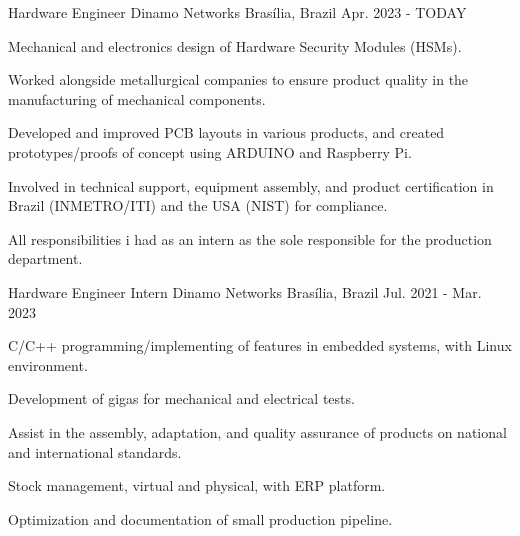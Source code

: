 

\begin{cventries}

  \cventry
    {Hardware Engineer} %
    {Dinamo Networks} %
    {Brasília, Brazil} %
    {Apr. 2023 - TODAY} %
    {
      \begin{cvitems} %
        \item {Mechanical and electronics design of Hardware Security Modules (HSMs).}
        \item {Worked alongside metallurgical companies to ensure product quality in the manufacturing of mechanical components.}
        \item {Developed and improved PCB layouts in various products, and created prototypes/proofs of concept using ARDUINO and Raspberry Pi.}
        \item {Involved in technical support, equipment assembly, and product certification in Brazil (INMETRO/ITI) and the USA (NIST) for compliance.}
        \item {All responsibilities i had as an intern as the sole responsible for the production department.}
      \end{cvitems}
    }

  \cventry
    {Hardware Engineer Intern} %
    {Dinamo Networks} %
    {Brasília, Brazil} %
    {Jul. 2021 - Mar. 2023} %
    {
      \begin{cvitems} %
        \item {C/C++ programming/implementing of features in embedded systems, with Linux environment.}
        \item {Development of gigas for mechanical and electrical tests.}
        \item {Assist in the assembly, adaptation, and quality assurance of products on national and international standards.}
        \item {Stock management, virtual and physical, with ERP platform.}
        \item {Optimization and documentation of small production pipeline.}
      \end{cvitems}
    }


\end{cventries}

